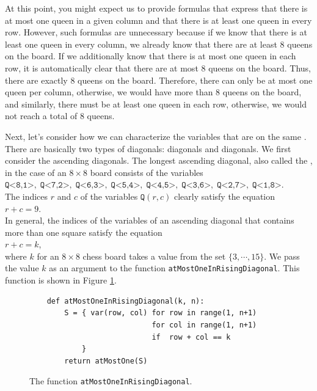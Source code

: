 At this point, you might expect us to provide formulas that express that there is at most one queen in a given column and that there is at least one queen in every row.
However, such formulas are unnecessary because if we know that there is at least one queen in every column, we already know that there are at least 8 queens on the board.
If we additionally know that there is at most one queen in each row, it is automatically clear that there are at most 8 queens on the board. Thus, there are exactly
8 queens on the board. Therefore, there can only be at most one queen per column, otherwise, we would have more than 8 queens on the board, and similarly, there must be at least one queen in each row, otherwise, we would not reach a total of 8 queens.

Next, let's consider how we can characterize the variables that are on the same .
There are basically two types of diagonals:  diagonals and  diagonals. We first consider
the ascending diagonals. The longest ascending diagonal, also called the
, in the case of an $8 \times 8$ board consists of the
variables \\[0.2cm]
\hspace*{1.3cm} 
$\texttt{Q<8,1>},\; \texttt{Q<7,2>},\; \texttt{Q<6,3>},\; \texttt{Q<5,4>},\; \texttt{Q<4,5>},\; \texttt{Q<3,6>},\; 
 \texttt{Q<2,7>},\; \texttt{Q<1,8>}$.
\\[0.2cm]
The indices $r$ and $c$ of the variables $\texttt{Q}(r,c)$ clearly satisfy
the equation \\[0.2cm]
\hspace*{1.3cm} $r + c = 9$. \\[0.2cm]
In general, the indices of the variables of an ascending diagonal that contains more than one square satisfy the
equation \\[0.2cm] 
\hspace*{1.3cm} $r + c = k$, \\[0.2cm]
where $k$ for an $8 \times 8$ chess board takes a value from the set $\{3, \cdots, 15 \}$. We pass the value $k$ as an argument to the
function \texttt{atMostOneInRisingDiagonal}. This function is shown in Figure
\ref{fig:atMostOneInUpperDiagonal}.


\begin{figure}[!ht]
  \centering
\begin{verbatim}
    def atMostOneInRisingDiagonal(k, n):
        S = { var(row, col) for row in range(1, n+1)
                            for col in range(1, n+1) 
                            if  row + col == k 
            }
        return atMostOne(S)
\end{verbatim}
\vspace*{-0.3cm}
  \caption{The function \texttt{atMostOneInRisingDiagonal}.}
  \label{fig:atMostOneInUpperDiagonal}
\end{figure}

